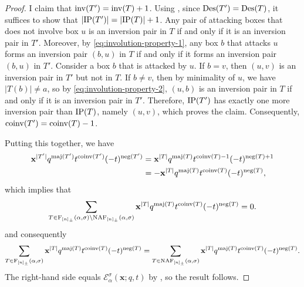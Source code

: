 \begin{proof}
	I claim that \(\inv(T') = \inv(T) + 1\).
	Using , since \(\Des(T') = \Des(T)\), it suffices to show that \(\left|\operatorname{IP}(T')\right| = \left|\operatorname{IP}(T)\right| + 1\).
	Any pair of attacking boxes that does not involve box \(u\) is an inversion pair in \(T\) if and only if it is an inversion pair in \(T'\).
	Moreover, by \eqref{eq:involution-property-1}, any box \(b\) that attacks \(u\) forms an inversion pair \((b, u)\) in \(T\) if and only if it forms an inversion pair \((b, u)\) in \(T'\).
	Consider a box \(b\) that is attacked by \(u\).
	If \(b = v\), then \((u, v)\) is an inversion pair in \(T'\) but not in \(T\).
	If \(b \neq v\), then by minimality of \(u\), we have \(|T(b)| \neq a\), so by \eqref{eq:involution-property-2}, \((u, b)\) is an inversion pair in \(T\) if and only if it is an inversion pair in \(T'\).
	Therefore, \(\operatorname{IP}(T')\) has exactly one more inversion pair than \(\operatorname{IP}(T)\), namely \((u, v)\),
	which proves the claim.
	Consequently, \(\coinv(T') = \coinv(T) - 1\).

	Putting this together, we have
	\begin{align*}
		\mathbf{x}^{|T'|} q^{\maj(T')} t^{\coinv(T')} (-t)^{\operatorname{neg}(T')}
		&= \mathbf{x}^{|T|} q^{\maj(T)} t^{\coinv(T) - 1} (-t)^{\operatorname{neg}(T) + 1} \\
		&= - \mathbf{x}^{|T|} q^{\maj(T)} t^{\coinv(T)} (-t)^{\operatorname{neg}(T)},
	\end{align*}
	which implies that
	\begin{equation*}
		\sum_{T \in \Fill[\interval{n}_\pm](\alpha, \sigma) \setminus \NAF[\interval{n}_\pm](\alpha, \sigma)}
		\mathbf{x}^{|T|} q^{\maj(T)} t^{\coinv(T)} (-t)^{\operatorname{neg}(T)} = 0.
	\end{equation*}
	and consequently
	\begin{equation*}
		\sum_{T \in \Fill[\interval{n}_\pm](\alpha, \sigma)}
		\mathbf{x}^{|T|} q^{\maj(T)} t^{\coinv(T)} (-t)^{\operatorname{neg}(T)}
		=
		\sum_{T \in \NAF[\interval{n}_\pm](\alpha, \sigma)}
		\mathbf{x}^{|T|} q^{\maj(T)} t^{\coinv(T)} (-t)^{\operatorname{neg}(T)}.
	\end{equation*}
	The right-hand side equals \(\mathcal{E}^{\sigma}_{\alpha}(\mathbf{x}; q, t)\) by ,
	so the result follows.
\end{proof}